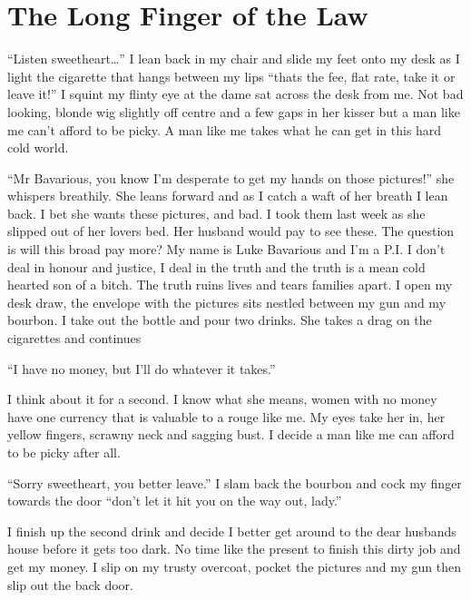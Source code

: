 \chapter{The Long Finger of the Law}





``Listen sweetheart{\ldots}'' I lean back in my chair and slide my feet
onto my desk as I light the cigarette that hangs between my lips
``thats the fee, flat rate, take it or leave it!'' I squint my flinty
eye at the dame sat across the desk from me. Not bad looking,
blonde wig slightly off centre and a few gaps in her kisser but a
man like me can't afford to be picky. A man like me takes what he
can get in this hard cold world.

``Mr Bavarious, you know I'm desperate to get my hands on those
pictures!'' she whispers breathily. She leans forward and as I catch
a waft of her breath I lean back. I bet she wants these pictures,
and bad. I took them last week as she slipped out of her lovers
bed. Her husband would pay to see these. The question is will this
broad pay more? My name is Luke Bavarious and I'm a P.I. I don't
deal in honour and justice, I deal in the truth and the truth is a
mean cold hearted son of a bitch. The truth ruins lives and tears
families apart. I open my desk draw, the envelope with the pictures
sits nestled between my gun and my bourbon. I take out the bottle
and pour two drinks. She takes a drag on the cigarettes and
continues

``I have no money, but I'll do whatever it takes.''

I think about it for a second. I know what she means, women with no
money have one currency that is valuable to a rouge like me. My
eyes take her in, her yellow fingers, scrawny neck and sagging
bust. I decide a man like me can afford to be picky after
all.

``Sorry sweetheart, you better leave.'' I slam back the bourbon and
cock my finger towards the door ``don't let it hit you on the way
out, lady.''



I finish up the second drink and decide I better get around to the
dear husbands house before it gets too dark. No time like the
present to finish this dirty job and get my money. I slip on my
trusty overcoat, pocket the pictures and my gun then slip out the
back door.



